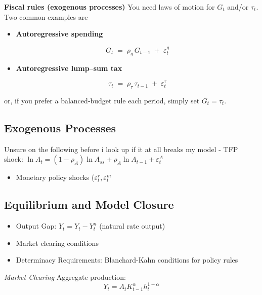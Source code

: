 \documentclass[11pt,preprint]{elsarticle}
\numberwithin{equation}{section}
\numberwithin{figure}{section}
\numberwithin{table}{section}
\def\tightlist{} %
\begin{document}
\textbf{Fiscal rules (exogenous processes)} You need laws of motion for
\(G_t\) and/or \(\tau_t\). Two common examples are

\begin{itemize}
\item
  \textbf{Autoregressive spending}

  \[
    G_t \;=\;\rho_g\,G_{t-1} \;+\; \varepsilon^g_t
    \tag{Exog.\ spending}
  \]
\item
  \textbf{Autoregressive lump--sum tax}

  \[
    \tau_t \;=\;\rho_\tau\,\tau_{t-1} \;+\; \varepsilon^\tau_t
    \tag{Exog.\ tax}
  \]
\end{itemize}

or, if you prefer a balanced‐budget rule each period, simply set
\(G_t = \tau_t\).

\subsection{Exogenous Processes}\label{exogenous-processes}

Unsure on the following before i look up if it at all breaks my model -
TFP shock:
\(\ln A_t = (1-\rho_A)\ln A_{ss} + \rho_A \ln A_{t-1} + \varepsilon_t^A\)

\begin{itemize}
\tightlist
\item
  Monetary policy shocks (\(\varepsilon_t^r, \varepsilon_t^m\)
\end{itemize}

\subsection{Equilibrium and Model
Closure}\label{equilibrium-and-model-closure}

\begin{itemize}
\item
  Output Gap: \(\hat{Y}_t = Y_t - Y_t^n\) (natural rate output)
\item
  Market clearing conditions
\item
  Determinacy Requirements: Blanchard-Kahn conditions for policy rules
\end{itemize}

\emph{Market Clearing} Aggregate production: \begin{equation}
Y_t = A_t K_{t-1}^{\alpha} h_t^{1-\alpha}
\label{aggregate_production}
\end{equation}
\end{document}
